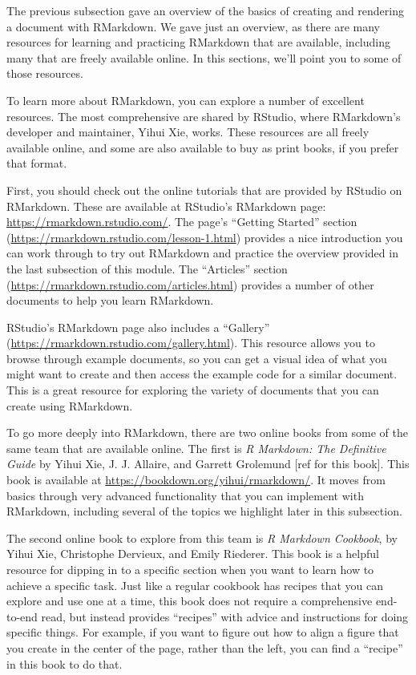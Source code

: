\documentclass[]{tufte-book}
\begin{document}
The previous subsection gave an overview of the basics of creating and
rendering a document with RMarkdown. We gave just an overview, as there are
many resources for learning and practicing RMarkdown that are available, including
many that are freely available online. In this sections, we'll point you to
some of those resources.

To learn more about RMarkdown, you can explore a number of excellent resources.
The most comprehensive are shared by RStudio, where RMarkdown's developer
and maintainer, Yihui Xie, works. These resources are all freely available
online, and some are also available to buy as print books, if you prefer that
format.

First, you should check out the online tutorials that are provided by RStudio on
RMarkdown. These are available at RStudio's RMarkdown page:
\url{https://rmarkdown.rstudio.com/}. The page's ``Getting Started'' section
(\url{https://rmarkdown.rstudio.com/lesson-1.html}) provides a nice introduction
you can work through to try out RMarkdown and practice the overview provided
in the last subsection of this module. The ``Articles'' section
(\url{https://rmarkdown.rstudio.com/articles.html}) provides a number of other
documents to help you learn RMarkdown.

RStudio's RMarkdown page also includes a ``Gallery''
(\url{https://rmarkdown.rstudio.com/gallery.html}). This resource allows you to browse
through example documents, so you can get a visual idea of what you might want
to create and then access the example code for a similar document. This is a
great resource for exploring the variety of documents that you can create
using RMarkdown.

To go more deeply into RMarkdown, there are two online books from some of the
same team that are available online. The first is \emph{R Markdown: The Definitive
Guide} by Yihui Xie, J. J. Allaire, and Garrett Grolemund {[}ref for this book{]}.
This book is available at \url{https://bookdown.org/yihui/rmarkdown/}. It moves from
basics through very advanced functionality that you can implement with RMarkdown,
including several of the topics we highlight later in this subsection.

The second online book to explore from this team is \emph{R Markdown Cookbook},
by Yihui Xie, Christophe Dervieux, and Emily Riederer. This book is a helpful
resource for dipping in to a specific section when you want to learn how to
achieve a specific task. Just like a regular cookbook has recipes that you can
explore and use one at a time, this book does not require a comprehensive
end-to-end read, but instead provides ``recipes'' with advice and instructions
for doing specific things. For example, if you want to figure out how to
align a figure that you create in the center of the page, rather than the
left, you can find a ``recipe'' in this book to do that.
\end{document}
